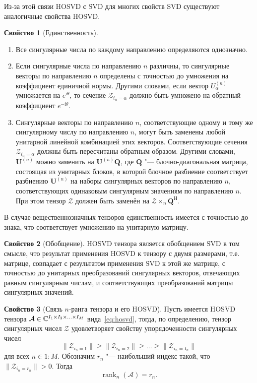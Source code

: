 \documentclass[specialist,
  substylefile=spbu_report.rtx,
subf,href,colorlinks=true, 12pt]{disser}
\theoremstyle{plain}
\theoremstyle{definition}
\newtheorem{property}{Свойство}[section]
\theoremstyle{remark}
\newcommand{\iu}{\mathrm{i}}
\begin{document}
Из-за этой связи HOSVD с SVD для многих свойств SVD существуют
аналогичные свойства HOSVD\@.
\begin{property}[Единственность]
  \leavevmode
  \begin{enumerate}
    \item Все сингулярные числа по каждому направлению определяются
      однозначно.
    \item Если сингулярные числа по направлению $n$ различны, то
      сингулярные векторы по направлению $n$ определены
      с точностью до умножения на коэффициент единичной нормы.
      Другими словами, если вектор $U_\alpha^{(n)}$ умножается на
      $e^{\iu\theta}$, то
      сечение $\mathcal{Z}_{i_n=\alpha}$ должно быть умножено на обратный
      коэффициент $e^{-\iu\theta}$.
    \item Сингулярные векторы по направлению $n$, соответствующие
      одному и тому же сингулярному числу по направлению $n$, могут
      быть заменены любой унитарной линейной комбинацией этих векторов.
      Соответствующие сечения $\mathcal{Z}_{i_n=\alpha}$ должны быть
      пересчитаны обратным образом.
      Другими словами, $\mathbf{U}^{(n)}$ можно заменить на
      $\mathbf{U}^{(n)}\mathbf{Q}$,
      где $\mathbf{Q}$ "--- блочно-диагональная матрица, состоящая из
      унитарных блоков, в которой блочное
      разбиение соответствует разбиению $\mathbf{U}^{(n)}$
      на наборы сингулярных векторов по направлению $n$,
      соответствующих одинаковым сингулярным значениям
      по направлению $n$.
      При этом тензор $\mathcal{Z}$ должен быть заменён на
      $\mathcal{Z}\times_{n} \mathbf{Q}^{\mathrm{H}}$.
  \end{enumerate}
  В случае вещественнозначных тензоров единственность имеется с
  точностью до знака, что соответствует
  умножению на унитарную матрицу.
\end{property}

\begin{property}[Обобщение]
  HOSVD тензора является обобщением SVD в том смысле, что
  результат применения HOSVD к тензору с двумя размерами, т.е.
  матрице, совпадает
  с результатом применения SVD к этой же матрице, с точностью до
  унитарных преобразований сингулярных векторов,
  отвечающих равным сингулярным числам, и соответствующих преобразований
  матрицы сингулярных значений.
\end{property}

\begin{property}
  [Связь $n$-ранга тензора и его HOSVD]
  \label{property:n-rank}
  Пусть имеется HOSVD тензора $\mathcal{A}\in \mathbb{C}^{I_1\times
  I_2\times \ldots \times I_M}$
  вида~\eqref{eq:hosvd},
  тогда, по определению, тензор сингулярных чисел $\mathcal{Z}$
  удовлетворяет свойству упорядоченности
  сингулярных чисел
  \[\|\mathcal{Z}_{i_n=1}\|\geqslant\|\mathcal{Z}_{i_n=2}\|\geqslant\ldots
  \geqslant \|\mathcal{Z}_{i_n=I_n}\|\]
  для всех $n\in \overline{1:M}$.
  Обозначим $r_n$ "--- наибольший индекс такой, что
  $\|\mathcal{Z}_{i_n=r_n}\|>0$.
  Тогда
  \begin{equation}
    \operatorname{rank}_n(\mathcal{A})=r_n.\label{eq:n-rank}
  \end{equation}
\end{property}
\end{document}
